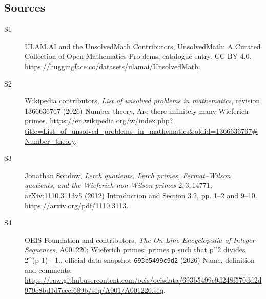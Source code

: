 \documentclass[11pt]{article}
\begin{document}
\subsection{Sources}
\begin{description}
\item[\hypertarget{source:statement:1}{S1}] ULAM.AI and the UnsolvedMath Contributors, UnsolvedMath: A Curated Collection of Open Mathematics Problems, catalogue entry. CC BY 4.0. \url{https://huggingface.co/datasets/ulamai/UnsolvedMath}.
\item[\hypertarget{source:statement:2}{S2}] Wikipedia contributors, \emph{List of unsolved problems in mathematics}, revision 1366636767 (2026) Number theory, Are there infinitely many Wieferich primes. \url{https://en.wikipedia.org/w/index.php?title=List_of_unsolved_problems_in_mathematics&oldid=1366636767#Number_theory}.
\item[\hypertarget{source:statement:3}{S3}] Jonathan Sondow, \emph{Lerch quotients, Lerch primes, Fermat--Wilson quotients, and the Wieferich-non-Wilson primes $2,3,14771$}, arXiv:1110.3113v5 (2012) Introduction and Section 3.2, pp. 1--2 and 9--10. \url{https://arxiv.org/pdf/1110.3113}.
\item[\hypertarget{source:statement:4}{S4}] OEIS Foundation and contributors, \emph{The On-Line Encyclopedia of Integer Sequences}, A001220: Wieferich primes: primes p such that p\textasciicircum{}2 divides 2\textasciicircum{}(p-1) - 1., official data snapshot \texttt{693b5499c9d2} (2026) Name, definition and comments. \url{https://raw.githubusercontent.com/oeis/oeisdata/693b5499c9d248f570dd2d979e8bd1d7eecf689b/seq/A001/A001220.seq}.
\end{description}
\label{end:statement}
\end{document}
